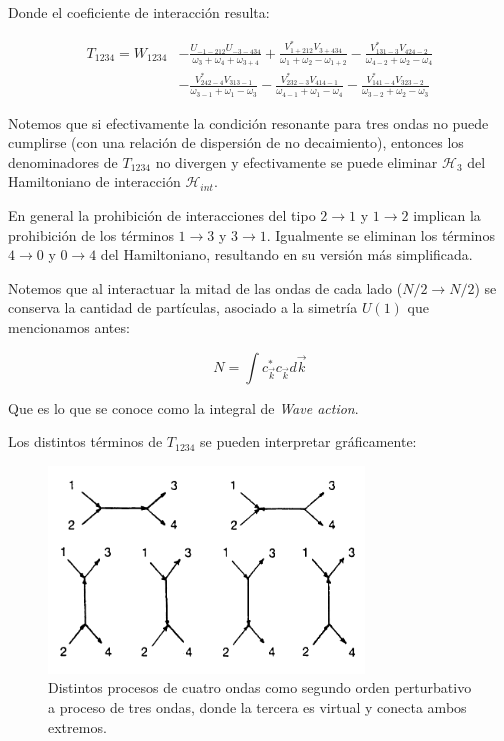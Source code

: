 Donde el coeficiente de interacción resulta:

\begin{align}
	T_{1234} = W_{1234} &-\frac{U_{-1-212}U_{-3-434}}{\omega_3+\omega_4+\omega_{3+4}} + \frac{V^*_{1+212}V_{3+434}}{\omega_1+\omega_2-\omega_{1+2}} 	-\frac{V^*_{131-3}V_{424-2}}{\omega_{4-2}+\omega_2-\omega_4} \\ 
	&- \frac{V^*_{242-4}V_{313-1}}{\omega_{3-1}+\omega_1-\omega_3} 
	-\frac{V^*_{232-3}V_{414-1}}{\omega_{4-1}+\omega_1-\omega_4}-\frac{V^*_{141-4}V_{323-2}}{\omega_{3-2}+\omega_2-\omega_3} 
\end{align} 

Notemos que si efectivamente la condición resonante para tres ondas no puede cumplirse (con una relación de dispersión de no decaimiento), entonces los denominadores de $T_{1234}$ no divergen y efectivamente se puede eliminar $\mathcal{H}_3$ del Hamiltoniano de interacción $\mathcal{H}_{int}$.

En general la prohibición de interacciones del tipo $2\rightarrow1$ y $1\rightarrow2$ implican la prohibición de los términos $1\rightarrow3$ y $3\rightarrow1$. Igualmente se eliminan los términos $4\rightarrow0$ y $0\rightarrow4$ del Hamiltoniano, resultando en su versión más simplificada.


Notemos que al interactuar la mitad de las ondas de cada lado ($N/2\rightarrow N/2$) se conserva la cantidad de partículas, asociado a la simetría $U(1)$ que mencionamos antes:

\begin{equation}
	N = \int c^*_{\vec k}c_{\vec k} d\vec k
	\label{eq:Wave_action_integral}
\end{equation}

Que es lo que se conoce como la integral de \textit{Wave action}.


Los distintos términos de $T_{1234}$ se pueden interpretar gráficamente:

\begin{figure}[!ht]
	\centering
	\includegraphics[width=0.7\linewidth]{Figures/Antecedentes_teoricos/Procesos_de_4_ondas}
	\caption{Distintos procesos de cuatro ondas como segundo orden perturbativo a proceso de tres ondas, donde la tercera es virtual y conecta ambos extremos. } %
	\label{fig:procesosde4ondas}
\end{figure}



